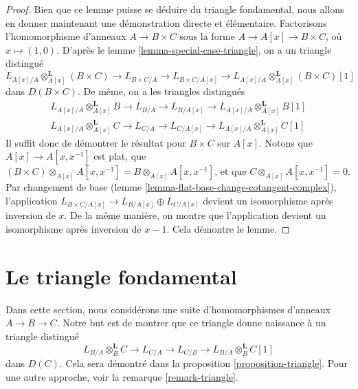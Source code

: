 \begin{proof}
Bien que ce lemme puisse se déduire du triangle fondamental, nous allons en
donner maintenant une démonstration directe et élémentaire. Factorisons
l'homomorphisme d'anneaux $A \to B \times C$ sous la forme
$A \to A[x] \to B \times C$, où $x \mapsto (1, 0)$. D'après le lemme
\ref{lemma-special-case-triangle}, on a un triangle distingué
$$
L_{A[x]/A} \otimes_{A[x]}^\mathbf{L} (B \times C) \to L_{B \times C/A} \to
L_{B \times C/A[x]} \to L_{A[x]/A} \otimes_{A[x]}^\mathbf{L} (B \times C)[1]
$$
dans $D(B \times C)$. De même, on a les triangles distingués
$$
\begin{matrix}
L_{A[x]/A} \otimes_{A[x]}^\mathbf{L} B \to L_{B/A} \to L_{B/A[x]}
\to L_{A[x]/A} \otimes_{A[x]}^\mathbf{L} B[1] \\
L_{A[x]/A} \otimes_{A[x]}^\mathbf{L} C \to L_{C/A} \to L_{C/A[x]}
\to L_{A[x]/A} \otimes_{A[x]}^\mathbf{L} C[1]
\end{matrix}
$$
Il suffit donc de démontrer le résultat pour $B \times C$ sur $A[x]$.
Notons que $A[x] \to A[x, x^{-1}]$ est plat, que
$(B \times C) \otimes_{A[x]} A[x, x^{-1}] = B \otimes_{A[x]} A[x, x^{-1}]$,
et que $C \otimes_{A[x]} A[x, x^{-1}] = 0$. Par changement de base (lemme
\ref{lemma-flat-base-change-cotangent-complex}), l'application
$L_{B \times C/A[x]} \to L_{B/A[x]} \oplus L_{C/A[x]}$ devient un
isomorphisme après inversion de $x$. De la même manière, on montre que
l'application devient un isomorphisme après inversion de $x - 1$. Cela
démontre le lemme.
\end{proof}




\section{Le triangle fondamental}
\label{section-triangle}

\noindent
Dans cette section, nous considérons une suite d'homomorphismes d'anneaux
$A \to B \to C$. Notre but est de montrer que ce triangle donne naissance
à un triangle distingué
\begin{equation}
\label{equation-triangle}
L_{B/A} \otimes_B^\mathbf{L} C \to L_{C/A} \to L_{C/B} \to
L_{B/A} \otimes_B^\mathbf{L} C[1]
\end{equation}
dans $D(C)$. Cela sera démontré dans la proposition
\ref{proposition-triangle}. Pour une autre approche, voir la remarque
\ref{remark-triangle}.

